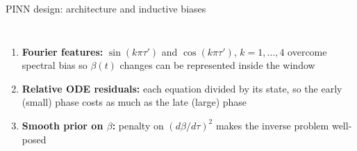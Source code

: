 \begin{frame}{PINN design: architecture and inductive biases}
\begin{columns}[T,onlytextwidth]
\begin{enumerate}
    \item \textbf{Fourier features:} $\sin(k\pi\tau')$ and $\cos(k\pi\tau')$, $k=1,\ldots,4$ overcome spectral bias so $\beta(t)$ changes can be represented inside the window
    \item \textbf{Relative ODE residuals:} each equation divided by its state, so the early (small) phase costs as much as the late (large) phase
    \item \textbf{Smooth prior on $\beta$:} penalty on $(d\beta/d\tau)^2$ makes the inverse problem well-posed
  \end{enumerate}
\end{columns}
\end{frame}

